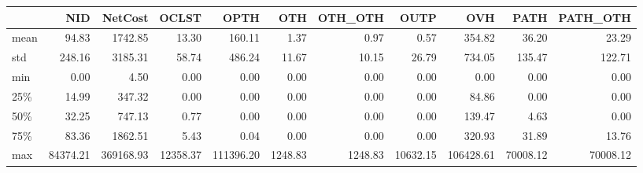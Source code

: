 \begin{tabular}{lrrrrrrrrrr}
\toprule
{} &       NID &    NetCost &     OCLST &       OPTH &      OTH &  OTH\_OTH &      OUTP &        OVH &      PATH &  PATH\_OTH \\
\midrule
mean &     94.83 &    1742.85 &     13.30 &     160.11 &     1.37 &     0.97 &      0.57 &     354.82 &     36.20 &     23.29 \\
std  &    248.16 &    3185.31 &     58.74 &     486.24 &    11.67 &    10.15 &     26.79 &     734.05 &    135.47 &    122.71 \\
min  &      0.00 &       4.50 &      0.00 &       0.00 &     0.00 &     0.00 &      0.00 &       0.00 &      0.00 &      0.00 \\
25\%  &     14.99 &     347.32 &      0.00 &       0.00 &     0.00 &     0.00 &      0.00 &      84.86 &      0.00 &      0.00 \\
50\%  &     32.25 &     747.13 &      0.77 &       0.00 &     0.00 &     0.00 &      0.00 &     139.47 &      4.63 &      0.00 \\
75\%  &     83.36 &    1862.51 &      5.43 &       0.04 &     0.00 &     0.00 &      0.00 &     320.93 &     31.89 &     13.76 \\
max  &  84374.21 &  369168.93 &  12358.37 &  111396.20 &  1248.83 &  1248.83 &  10632.15 &  106428.61 &  70008.12 &  70008.12 \\
\bottomrule
\end{tabular}
